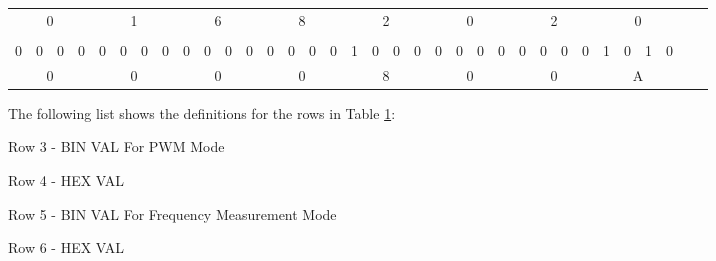 \documentclass[12pt]{article}
\begin{document}
\begin{table}
\begin{center}
\begin{adjustbox}{width=\textwidth}
\begin{tabular}{ cccccccccccccccccccccccccccccccccc }
\multicolumn{4}{|c|}{0} & \multicolumn{4}{c|}{1} & \multicolumn{4}{c|}{6} & \multicolumn{4}{c|}{8} & \multicolumn{4}{c|}{2} & \multicolumn{4}{c|}{0} & \multicolumn{4}{c|}{2} & \multicolumn{4}{c|}{0}  \\ \cline{1-32}

& & & & & & & & & & & & & & & & & & & & & & & & & & & & & & &  \\ \cline{1-32}

\multicolumn{1}{|c}{0} & \multicolumn{1}{|c|}{0} & \multicolumn{1}{c}{0} & \multicolumn{1}{c|}{0} & \multicolumn{1}{c|}{0} & \multicolumn{1}{c|}{0} & \multicolumn{1}{c|}{0} & \multicolumn{1}{c|}{0} & \multicolumn{1}{c|}{0} & \multicolumn{1}{c|}{0} & \multicolumn{1}{c|}{0} & \multicolumn{1}{c}{0} & \multicolumn{1}{c}{0} & \multicolumn{1}{c|}{0} & \multicolumn{1}{c|}{0} & \multicolumn{1}{c}{0} & \multicolumn{1}{c}{1} & \multicolumn{1}{c}{0} & \multicolumn{1}{c}{0} & \multicolumn{1}{c}{0} & \multicolumn{1}{c|}{0} & \multicolumn{1}{c}{0} & \multicolumn{1}{c|}{0} & \multicolumn{1}{c}{0} & \multicolumn{1}{c|}{0} & \multicolumn{1}{c}{0} & \multicolumn{1}{c}{0} & \multicolumn{1}{c|}{0} & \multicolumn{1}{c}{1} & \multicolumn{1}{c}{0} & \multicolumn{1}{c}{1} & \multicolumn{1}{c|}{0}   \\ \cline{1-32}

\multicolumn{4}{|c|}{0} & \multicolumn{4}{c|}{0} & \multicolumn{4}{c|}{0} & \multicolumn{4}{c|}{0} & \multicolumn{4}{c|}{8} & \multicolumn{4}{c|}{0} & \multicolumn{4}{c|}{0} & \multicolumn{4}{c|}{A}  \\ \cline{1-32}

 
\end{tabular}
\end{adjustbox}

\label{countermode}
\end{center}

\end{table}

The following list shows the definitions for the rows in Table \ref{countermode}:

\begin{itemize*}
	\item Row 3 - BIN VAL For PWM Mode
	\item Row 4 - HEX VAL
	\item Row 5 - BIN VAL For Frequency Measurement Mode
	\item Row 6 - HEX VAL
\end{itemize*}
\end{document}
